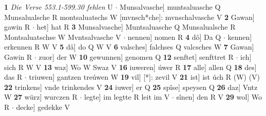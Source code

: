 \documentclass[8pt,a4paper,notitlepage]{article}
\begin{document}
\begin{table}[ht]
\begin{minipage}[t]{0.5\linewidth}
\textbf{1} \textit{Die Verse 553.1-599.30 fehlen} U   $\cdot$ Munsalvasche] muntsaluasche Q Munsalualsche R montsaluatschs W [mvnsch*che]: mvnschalvasche V \textbf{2} Gawan] gawin R  $\cdot$ het] hat R \textbf{3} Munsalvasche] Muntsaluasche Q Munsalualsche R Montsaluatschse W Mvntsalvasche V  $\cdot$ nennen] nomen R \textbf{4} dô] Da Q  $\cdot$ kennen] erkennen R W V \textbf{5} dâ] do Q W V \textbf{6} valsches] falchses Q valcsches W \textbf{7} Gawan] Gawin R  $\cdot$ zuor] der W \textbf{10} gewunnen] genomen Q \textbf{12} senftet] senfttret R  $\cdot$ ich] sich R W V \textbf{13} waz] Wo W Swaz V \textbf{16} iuweren] úwer R \textbf{17} alle] allen Q \textbf{18} des] das R  $\cdot$ triuwen] gantzen treúwen W \textbf{19} vil] [*]: zevil V \textbf{21} ist] ist úch R (W) (V) \textbf{22} trinkens] vnde trinkendes V \textbf{24} iuwer] er Q \textbf{25} spîse] speysen Q \textbf{26} daz] Vntz W \textbf{27} würz] wurczen R  $\cdot$ legte] im legtte R leit im V  $\cdot$ sînen] den R V \textbf{29} wol] Wo R  $\cdot$ decke] gedekke V \newline
\end{minipage}
\end{table}
\end{document}
